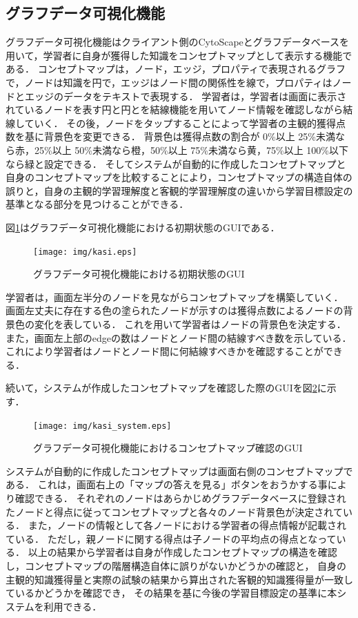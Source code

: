 \subsection{グラフデータ可視化機能}\label{subsec:kasi}
グラフデータ可視化機能はクライアント側のCytoScapeとグラフデータベースを用いて，学習者に自身が獲得した知識をコンセプトマップとして表示する機能である．
コンセプトマップは，ノード，エッジ，プロパティで表現されるグラフで，ノードは知識を円で，エッジはノード間の関係性を線で，プロパティはノードとエッジのデータをテキストで表現する．
学習者は，学習者は画面に表示されているノードを表す円と円とを結線機能を用いてノード情報を確認しながら結線していく．
その後，ノードをタップすることによって学習者の主観的獲得点数を基に背景色を変更できる．
背景色は獲得点数の割合が 0\%以上 25\%未満なら赤，25\%以上 50\%未満なら橙，50\%以上 75\%未満なら黄，75\%以上 100\%以下なら緑と設定できる．
そしてシステムが自動的に作成したコンセプトマップと自身のコンセプトマップを比較することにより，コンセプトマップの構造自体の誤りと，自身の主観的学習理解度と客観的学習理解度の違いから学習目標設定の基準となる部分を見つけることができる．

図\ref{fig:kasi}はグラフデータ可視化機能における初期状態のGUIである．


\begin{figure}[htbp]
\begin{center}
\texttt{[image: img/kasi.eps]}
\end{center}
\caption{グラフデータ可視化機能における初期状態のGUI}
\label{fig:kasi}
\end{figure}

学習者は，画面左半分のノードを見ながらコンセプトマップを構築していく．
画面左丈夫に存在する色の塗られたノードが示すのは獲得点数によるノードの背景色の変化を表している．
これを用いて学習者はノードの背景色を決定する．
また，画面左上部のedgeの数はノードとノード間の結線すべき数を示している．
これにより学習者はノードとノード間に何結線すべきかを確認することができる．

続いて，システムが作成したコンセプトマップを確認した際のGUIを図\ref{fig:kasi_system}に示す．

\begin{figure}[htbp]
\begin{center}
\texttt{[image: img/kasi\_system.eps]}
\end{center}
\caption{グラフデータ可視化機能におけるコンセプトマップ確認のGUI}
\label{fig:kasi_system}
\end{figure}

システムが自動的に作成したコンセプトマップは画面右側のコンセプトマップである．
これは，画面右上の「マップの答えを見る」ボタンをおうかする事により確認できる．
それぞれのノードはあらかじめグラフデータベースに登録されたノードと得点に従ってコンセプトマップと各々のノード背景色が決定されている．
また，ノードの情報として各ノードにおける学習者の得点情報が記載されている．
ただし，親ノードに関する得点は子ノードの平均点の得点となっている．
以上の結果から学習者は自身が作成したコンセプトマップの構造を確認し，コンセプトマップの階層構造自体に誤りがないかどうかの確認と，
自身の主観的知識獲得量と実際の試験の結果から算出された客観的知識獲得量が一致しているかどうかを確認でき，
その結果を基に今後の学習目標設定の基準に本システムを利用できる．